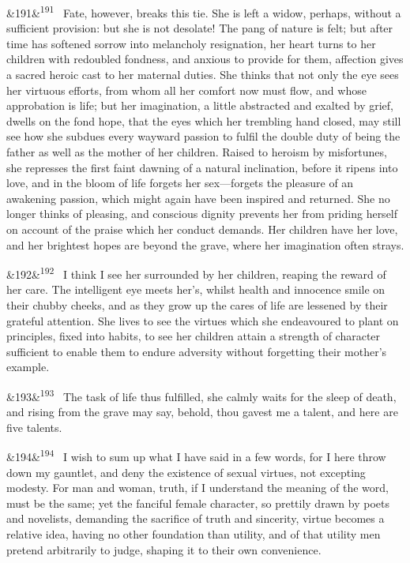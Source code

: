 \documentclass[12pt]{article}
\newcommand{\para}[1][]{\par\noindent\ifx&#1&\else\textsuperscript{\footnotesize #1}~\fi}
\begin{document}
\para[191] Fate, however, breaks this tie. She is left a widow, perhaps, without a sufficient provision: but she is not desolate! The pang of nature is felt; but after time has softened sorrow into melancholy resignation, her heart turns to her children with redoubled fondness, and anxious to provide for them, affection gives a sacred heroic cast to her maternal duties. She thinks that not only the eye sees her virtuous efforts, from whom all her comfort now must flow, and whose approbation is life; but her imagination, a little abstracted and exalted by grief, dwells on the fond hope, that the eyes which her trembling hand closed, may still see how she subdues every wayward passion to fulfil the double duty of being the father as well as the mother of her children. Raised to heroism by misfortunes, she represses the first faint dawning of a natural inclination, before it ripens into love, and in the bloom of life forgets her sex---forgets the pleasure of an awakening passion, which might again have been inspired and returned. She no longer thinks of pleasing, and conscious dignity prevents her from priding herself on account of the praise which her conduct demands. Her children have her love, and her brightest hopes are beyond the grave, where her imagination often strays.

\para[192] I think I see her surrounded by her children, reaping the reward of her care. The intelligent eye meets her's, whilst health and innocence smile on their chubby cheeks, and as they grow up the cares of life are lessened by their grateful attention. She lives to see the virtues which she endeavoured to plant on principles, fixed into habits, to see her children attain a strength of character sufficient to enable them to endure adversity without forgetting their mother's example.

\para[193] The task of life thus fulfilled, she calmly waits for the sleep of death, and rising from the grave may say, behold, thou gavest me a talent, and here are five talents.

\para[194] I wish to sum up what I have said in a few words, for I here throw down my gauntlet, and deny the existence of sexual virtues, not excepting modesty. For man and woman, truth, if I understand the meaning of the word, must be the same; yet the fanciful female character, so prettily drawn by poets and novelists, demanding the sacrifice of truth and sincerity, virtue becomes a relative idea, having no other foundation than utility, and of that utility men pretend arbitrarily to judge, shaping it to their own convenience.
\end{document}
